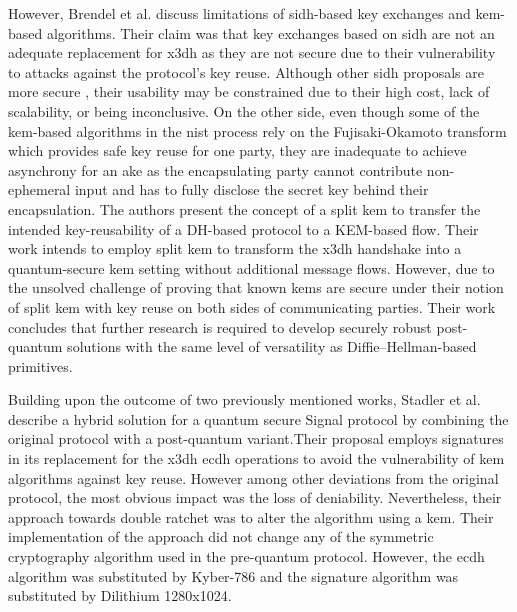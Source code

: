 However, Brendel et al. \cite{brendel2020towards} discuss limitations of \gls{sidh}-based key exchanges and \gls{kem}-based algorithms. Their claim was that key exchanges based on \gls{sidh} are not an adequate replacement for \gls{x3dh} as they are not secure due to their vulnerability to attacks against the protocol's key reuse. Although other \gls{sidh} proposals are more secure \cite{azarderakhsh2017post,basso2020adaptive,boneh2020multiparty}, their usability may be constrained due to their high cost, lack of scalability, or being inconclusive. On the other side, even though some of the \gls{kem}-based algorithms in the \gls{nist} process rely on the Fujisaki-Okamoto transform which provides safe key reuse for one party, they are inadequate to achieve asynchrony for an \gls{ake} as the encapsulating party cannot contribute non-ephemeral input and has to fully disclose the secret key behind their encapsulation. The authors present the concept of a split \gls{kem} to transfer the intended key-reusability of a DH-based protocol to a KEM-based flow. Their work intends to employ split \gls{kem} to transform the \gls{x3dh} handshake into a quantum-secure \gls{kem} setting without additional message flows. However, due to the unsolved challenge of proving that known \glspl{kem} are secure under their notion of split \gls{kem} with key reuse on both sides of communicating parties. Their work concludes that further research is required to develop securely robust post-quantum solutions with the same level of versatility as Diffie–Hellman-based primitives.
\par 
Building upon the outcome of two previously mentioned works, Stadler et al. \cite{stadler2021hybrid} describe a hybrid solution for a quantum secure Signal protocol by combining the original protocol with a post-quantum variant.Their proposal employs signatures in its replacement for the \gls{x3dh} \gls{ecdh} operations to avoid the vulnerability of \gls{kem} algorithms against key reuse. However among other deviations from the original protocol, the most obvious impact was the loss of deniability. Nevertheless, their approach towards double ratchet was to alter the algorithm using a \gls{kem}. Their implementation of the approach did not change any of the symmetric cryptography algorithm used in the pre-quantum protocol. However, the \gls{ecdh} algorithm was substituted by Kyber-786 and the signature algorithm was substituted by Dilithium 1280x1024. 